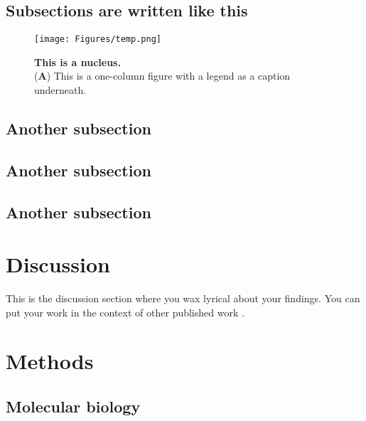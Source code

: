 \lipsum[10]

\subsection*{Subsections are written like this}

\lipsum[11]

\begin{figure}
\centering
\texttt{[image: Figures/temp.png]}
\caption{\textbf{This is a nucleus.}\\
(\textbf{A}) This is a one-column figure with a legend as a caption underneath.}
\label{fig:nucleus}
\end{figure}

\lipsum[12]

\subsection*{Another subsection}

\lipsum[13-14]

\subsection*{Another subsection}

\lipsum[13-14]

\subsection*{Another subsection}

\lipsum[13-14]

\section*{Discussion}\label{s:discussion}

This is the discussion section where you wax lyrical about your findings.
You can put your work in the context of other published work \citep{brenner_uga:_1967}.

\lipsum[100-104]

\section*{Methods}\label{s:methods}

\subsection*{Molecular biology}

